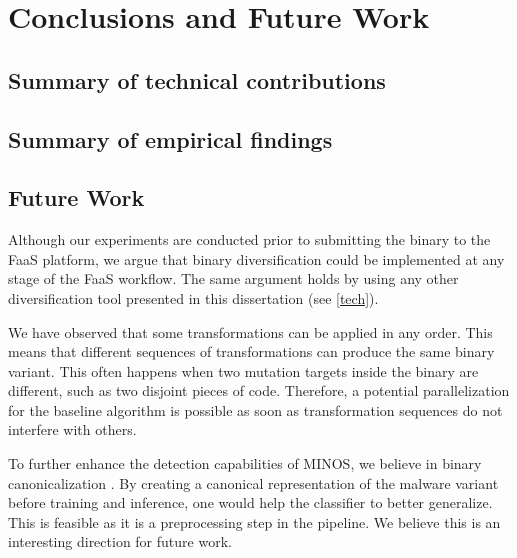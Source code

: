 
\chapter{Conclusions and Future Work}
\label{results}


\section{Summary of technical contributions}




\section{Summary of empirical findings}




\section{Future Work}

Although our experiments are conducted prior to submitting the \Wasm binary to the FaaS platform, we argue that \Wasm binary diversification could be implemented at any stage of the FaaS workflow.
The same argument holds by using any other diversification tool presented in this dissertation (see \autoref{tech}).





We have observed that some transformations can be applied in any order. 
This means that different sequences of transformations can produce the same binary variant. 
This often happens when two mutation targets inside the binary are different, such as two disjoint pieces of code.
Therefore, a potential parallelization for the baseline algorithm is possible as soon as transformation sequences do not interfere with others.


To further enhance the detection capabilities of MINOS, we believe in binary canonicalization \cite{4140990}. By creating a canonical representation of the malware variant before training and inference, one would help the classifier to better generalize. This is feasible as it is a preprocessing step in the pipeline. We believe this is an interesting direction for future work.



